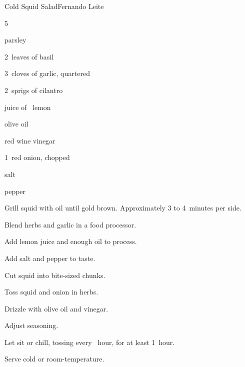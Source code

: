 \begin{recipe}{Cold Squid Salad}{Fernando Leite}{}

\begin{ingredients}
\item 5~
\item \C{\quarter} parsley
\item 2~leaves of basil
\item 3~cloves of garlic, quartered
\item 2~sprigs of cilantro
\item juice of \half~lemon
\item olive oil
\item red wine vinegar
\item 1~red onion, chopped
\item salt
\item pepper
\end{ingredients}

\begin{directions}
\item Grill squid with oil until gold brown. Approximately 3 to 4~minutes per side.
\item Blend herbs and garlic in a food processor.
\item Add lemon juice and enough oil to process.
\item Add salt and pepper to taste.
\item Cut squid into bite-sized chunks.
\item Toss squid and onion in herbs.
\item Drizzle with olive oil and vinegar.
\item Adjust seasoning.
\item Let sit or chill, tossing every \half~hour, for at least 1~hour.
\item Serve cold or room-temperature.
\end{directions}

\end{recipe}
